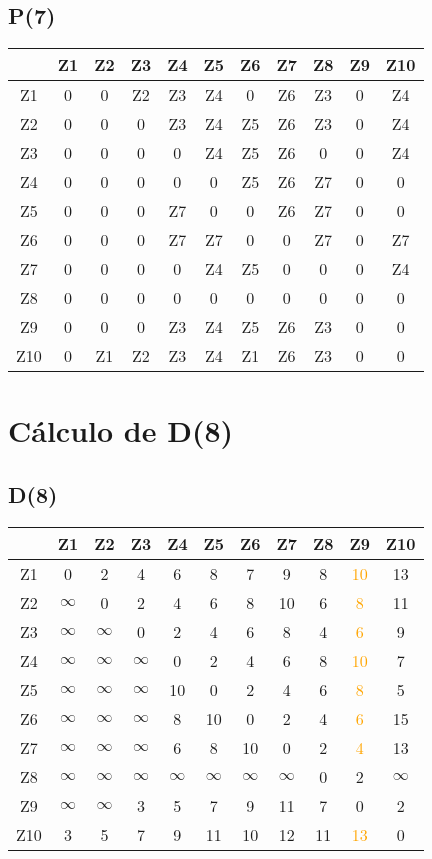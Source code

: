 \documentclass[a4paper,11pt]{article}
\begin{document}
\subsection*{P(7)}
\begin{center}
\begin{tabular}{c|cccccccccc}
 & Z1 & Z2 & Z3 & Z4 & Z5 & Z6 & Z7 & Z8 & Z9 & Z10 \\ \hline
Z1 & 0 & 0 & Z2 & Z3 & Z4 & 0 & Z6 & Z3 & 0 & Z4 \\
Z2 & 0 & 0 & 0 & Z3 & Z4 & Z5 & Z6 & Z3 & 0 & Z4 \\
Z3 & 0 & 0 & 0 & 0 & Z4 & Z5 & Z6 & 0 & 0 & Z4 \\
Z4 & 0 & 0 & 0 & 0 & 0 & Z5 & Z6 & Z7 & 0 & 0 \\
Z5 & 0 & 0 & 0 & Z7 & 0 & 0 & Z6 & Z7 & 0 & 0 \\
Z6 & 0 & 0 & 0 & Z7 & Z7 & 0 & 0 & Z7 & 0 & Z7 \\
Z7 & 0 & 0 & 0 & 0 & Z4 & Z5 & 0 & 0 & 0 & Z4 \\
Z8 & 0 & 0 & 0 & 0 & 0 & 0 & 0 & 0 & 0 & 0 \\
Z9 & 0 & 0 & 0 & Z3 & Z4 & Z5 & Z6 & Z3 & 0 & 0 \\
Z10 & 0 & Z1 & Z2 & Z3 & Z4 & Z1 & Z6 & Z3 & 0 & 0 \\
\end{tabular}
\end{center}
\newpage
\section*{Cálculo de D(8)}
\subsection*{D(8)}
\begin{center}
\begin{tabular}{c|cccccccccc}
 & Z1 & Z2 & Z3 & Z4 & Z5 & Z6 & Z7 & Z8 & Z9 & Z10 \\ \hline
Z1 & 0 & 2 & 4 & 6 & 8 & 7 & 9 & 8 & \textcolor{orange}{10} & 13 \\
Z2 & $\infty$ & 0 & 2 & 4 & 6 & 8 & 10 & 6 & \textcolor{orange}{8} & 11 \\
Z3 & $\infty$ & $\infty$ & 0 & 2 & 4 & 6 & 8 & 4 & \textcolor{orange}{6} & 9 \\
Z4 & $\infty$ & $\infty$ & $\infty$ & 0 & 2 & 4 & 6 & 8 & \textcolor{orange}{10} & 7 \\
Z5 & $\infty$ & $\infty$ & $\infty$ & 10 & 0 & 2 & 4 & 6 & \textcolor{orange}{8} & 5 \\
Z6 & $\infty$ & $\infty$ & $\infty$ & 8 & 10 & 0 & 2 & 4 & \textcolor{orange}{6} & 15 \\
Z7 & $\infty$ & $\infty$ & $\infty$ & 6 & 8 & 10 & 0 & 2 & \textcolor{orange}{4} & 13 \\
Z8 & $\infty$ & $\infty$ & $\infty$ & $\infty$ & $\infty$ & $\infty$ & $\infty$ & 0 & 2 & $\infty$ \\
Z9 & $\infty$ & $\infty$ & 3 & 5 & 7 & 9 & 11 & 7 & 0 & 2 \\
Z10 & 3 & 5 & 7 & 9 & 11 & 10 & 12 & 11 & \textcolor{orange}{13} & 0 \\
\end{tabular}
\end{center}
\end{document}
